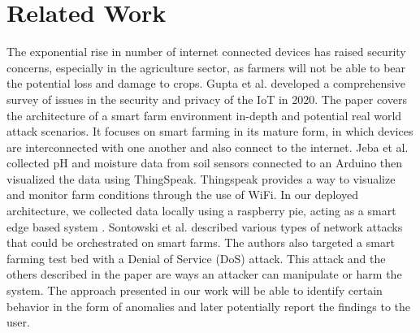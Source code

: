 \section{Related Work}
\label{sec:related}
The exponential rise in number of internet connected devices has raised security concerns, especially in the agriculture sector, as farmers will not be able to bear the potential loss and damage to crops. 
Gupta et al. \cite{gupta2020security} developed a comprehensive survey of issues in the security and privacy of the IoT in 2020. The paper covers the architecture of a smart farm environment in-depth and potential real world attack scenarios. It focuses on smart farming in its mature form, in which devices are interconnected with one another and also connect to the internet.  Jeba et al. collected pH and moisture data from soil sensors connected to an Arduino then visualized the data using ThingSpeak. Thingspeak provides a way to visualize and monitor farm conditions through the use of WiFi. In our deployed architecture, we collected data locally using a raspberry pie, acting as a smart edge based system \cite{jeba2018anomaly}. Sontowski et al. \cite{sontowski2020cyber} described various types of network attacks that could be orchestrated on smart farms. The authors also targeted a smart farming test bed with a Denial of Service (DoS) attack. This attack and the others described in the paper are ways an attacker can manipulate or harm the system. The approach presented in our work will be able to identify certain behavior in the form of anomalies and later potentially report the findings to the user. %

